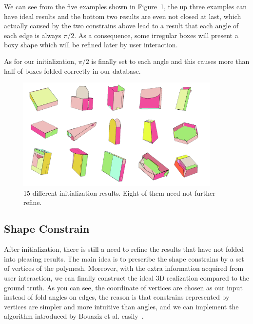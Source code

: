 We can see from the five examples shown in Figure~\ref{fig:initial}, the up three examples can have ideal results and the bottom two results are even not closed at last, which actually caused by the two constrains above lead to a result that each angle of each edge is always $\pi/2$. As a consequence, some irregular boxes will present a boxy shape which will be refined later by user interaction.

As for our initialization, $\pi/2$ is finally set to each angle and this causes more than half of boxes folded correctly in our database.



\begin{figure}
	\centering
	\includegraphics[width=0.9\textwidth]{images/initial2.jpg}
	\caption{15 different initialization results. Eight of them need not further refine. }
	\label{fig:initial}
\end{figure}


\subsection{Shape Constrain}
After initialization, there is still a need to refine the results that have not folded into pleasing results. The main idea is to prescribe the shape constrains by a set of vertices of the polymesh. Moreover, with the extra information acquired from user interaction, we can finally construct the ideal 3D realization compared to the ground truth. As you can see, the coordinate of vertices are chosen as our input instead of fold angles on edges, the reason is that constrains represented by vertices are simpler and more intuitive than angles, and we can implement the algorithm introduced by Bouaziz et al. easily~\cite{Bouaziz:2012:SSD:2346796.2346802}.

